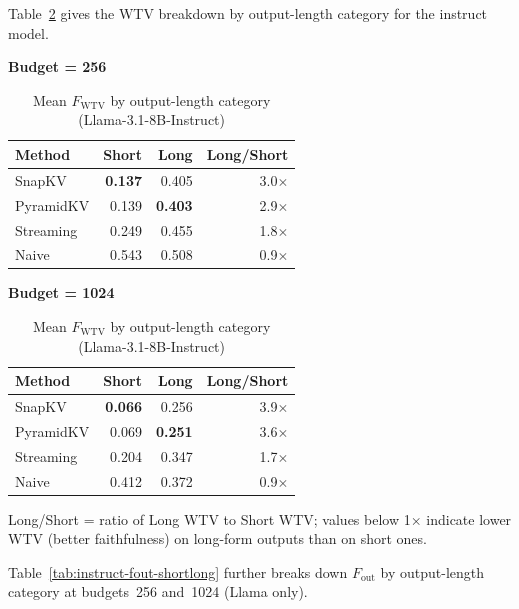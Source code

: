 \documentclass[10pt,letterpaper]{article}
\begin{document}
Table~\ref{tab:instruct-wtv-shortlong} gives the WTV breakdown by output-length category for the instruct model.

\begin{table}[H]
\centering
\small
\caption{Mean \(F_{\text{WTV}}\) by output-length category (Llama-3.1-8B-Instruct)}
\label{tab:instruct-wtv-shortlong}
\begin{minipage}[t]{0.47\textwidth}
\centering
\textbf{Budget = 256}\\[4pt]
\begin{tabular}{@{}lrrr@{}}
\toprule
Method & Short & Long & Long/Short\\
\midrule
SnapKV    & \textbf{0.137} & 0.405 & 3.0$\times$\\
PyramidKV & 0.139 & \textbf{0.403} & 2.9$\times$\\
Streaming & 0.249 & 0.455 & 1.8$\times$\\
Naive     & 0.543 & 0.508 & 0.9$\times$\\
\bottomrule
\end{tabular}
\end{minipage}
\hfill
\begin{minipage}[t]{0.47\textwidth}
\centering
\textbf{Budget = 1024}\\[4pt]
\begin{tabular}{@{}lrrr@{}}
\toprule
Method & Short & Long & Long/Short\\
\midrule
SnapKV    & \textbf{0.066} & 0.256 & 3.9$\times$\\
PyramidKV & 0.069 & \textbf{0.251} & 3.6$\times$\\
Streaming & 0.204 & 0.347 & 1.7$\times$\\
Naive     & 0.412 & 0.372 & 0.9$\times$\\
\bottomrule
\end{tabular}
\end{minipage}

\medskip
Long/Short = ratio of Long WTV to Short WTV; values below 1$\times$ indicate
lower WTV (better faithfulness) on long-form outputs than on short ones.
\end{table}

Table~\ref{tab:instruct-fout-shortlong} further breaks down \(F_{\text{out}}\) by output-length category at budgets~256 and~1024 (Llama only).
\end{document}
